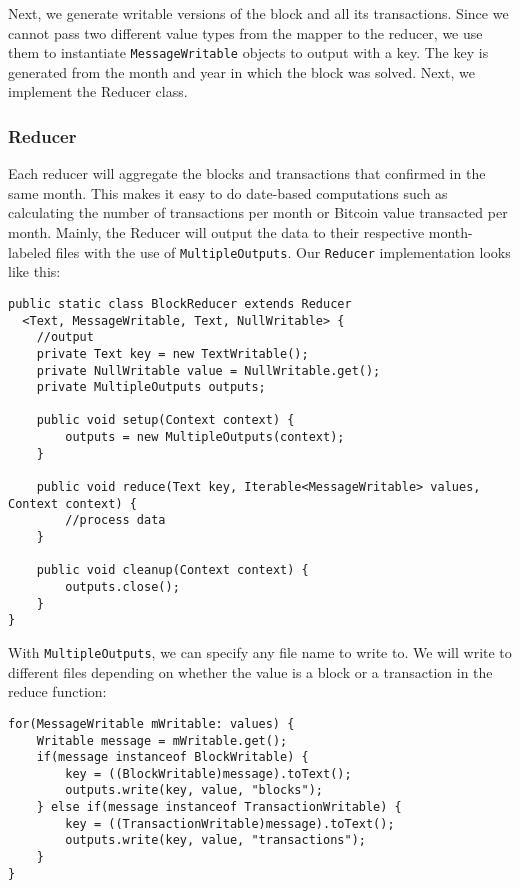 \documentclass[9pt,twocolumn,twoside]{idsi}
\begin{document}
Next, we generate writable versions of the block and all its transactions. Since we cannot pass two different value types from the mapper to the reducer, we use them to instantiate \lstinline{MessageWritable} objects to output with a key. The key is generated from the month and year in which the block was solved. Next, we implement the Reducer class.

\subsubsection{Reducer}
Each reducer will aggregate the blocks and transactions that confirmed in the same month. This makes it easy to do date-based computations such as calculating the number of transactions per month or Bitcoin value transacted per month. Mainly, the Reducer will output the data to their respective month-labeled files with the use of \lstinline{MultipleOutputs}. Our \lstinline{Reducer} implementation looks like this:

\begin{lstlisting}
public static class BlockReducer extends Reducer
  <Text, MessageWritable, Text, NullWritable> {
    //output
    private Text key = new TextWritable();
    private NullWritable value = NullWritable.get();
    private MultipleOutputs outputs;

    public void setup(Context context) {
        outputs = new MultipleOutputs(context);
    }

    public void reduce(Text key, Iterable<MessageWritable> values, Context context) {
        //process data
    }

    public void cleanup(Context context) {
        outputs.close();
    }
}
\end{lstlisting}

With \lstinline{MultipleOutputs}, we can specify any file name to write to. We will write to different files depending on whether the value is a block or a transaction in the reduce function:

\begin{lstlisting}
for(MessageWritable mWritable: values) {
    Writable message = mWritable.get();
    if(message instanceof BlockWritable) {
        key = ((BlockWritable)message).toText();
        outputs.write(key, value, "blocks");
    } else if(message instanceof TransactionWritable) {
        key = ((TransactionWritable)message).toText();
        outputs.write(key, value, "transactions");
    }
}
\end{lstlisting}
\end{document}
